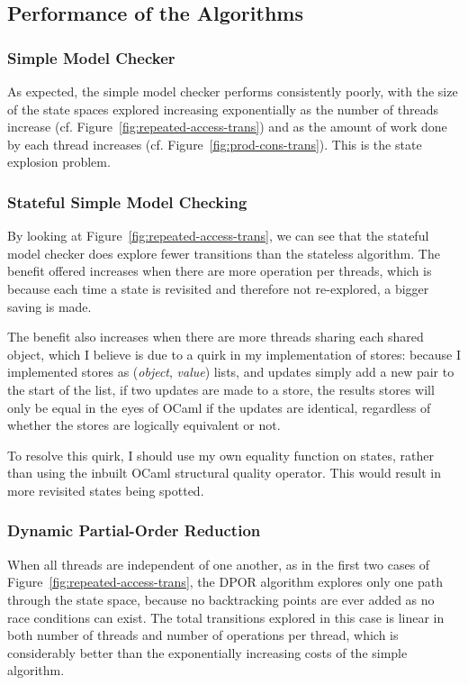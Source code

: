 \documentclass[12pt,a4paper,twoside,openright]{report}
\begin{document}
\subsection{Performance of the Algorithms}

\subsubsection{Simple Model Checker}
As expected, the simple model checker performs
consistently poorly, with the size of the state
spaces explored increasing exponentially as
the number of threads increase (cf.
Figure~\ref{fig:repeated-access-trans})
and as the amount of work done by each thread
increases (cf.
Figure~\ref{fig:prod-cons-trans}).
This is the state explosion problem.

\subsubsection{Stateful Simple Model Checking}
By looking at Figure~\ref{fig:repeated-access-trans},
we can see that the stateful model checker does
explore fewer transitions than the stateless
algorithm. The benefit offered increases
when there are more operation per threads,
which is because each time a state is
revisited and therefore not re-explored,
a bigger saving is made.

The benefit also increases when there are more
threads sharing each shared object, which I
believe is due to a quirk in my implementation
of stores: because I implemented stores as
(\textit{object}, \textit{value}) lists,
and updates simply
add a new pair to the start of the list,
if two updates are made to a store, the
results stores will only be equal in
the eyes of OCaml if the updates are
identical, regardless of whether the
stores are logically equivalent or not.

To resolve this quirk, I should use
my own equality function on states,
rather than using the inbuilt
OCaml structural quality operator.
This would result in more
revisited states being spotted.

\subsubsection{Dynamic Partial-Order Reduction}
When all threads are independent of one another,
as in the first two cases of
Figure~\ref{fig:repeated-access-trans},
the DPOR algorithm explores only one path
through the state space, because no
backtracking points are ever added as
no race conditions can exist. The total
transitions explored in this case is linear in both
number of threads and number of operations
per thread, which is considerably better
than the exponentially increasing costs
of the simple algorithm.
\end{document}
